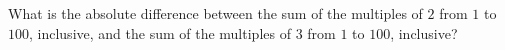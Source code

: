 What is the absolute difference between the sum of the multiples of $2$ from $1$ to $100$, inclusive, and the sum of the multiples of $3$ from $1$ to $100$, inclusive?
